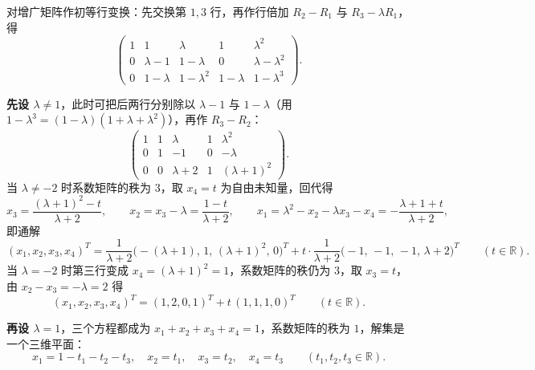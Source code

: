 \begin{solution}
对增广矩阵作初等行变换：先交换第 $1,3$ 行，再作行倍加 $R_2-R_1$ 与 $R_3-\lambda R_1$，得
\[
\left(\begin{array}{cccc|c}
1&1&\lambda&1&\lambda^{2}\\
0&\lambda-1&1-\lambda&0&\lambda-\lambda^{2}\\
0&1-\lambda&1-\lambda^{2}&1-\lambda&1-\lambda^{3}
\end{array}\right).
\]

\textbf{先设 $\lambda\ne1$}，此时可把后两行分别除以 $\lambda-1$ 与 $1-\lambda$（用 $1-\lambda^{3}=(1-\lambda)(1+\lambda+\lambda^{2})$），再作 $R_3-R_2$：
\[
\left(\begin{array}{cccc|c}
1&1&\lambda&1&\lambda^{2}\\
0&1&-1&0&-\lambda\\
0&0&\lambda+2&1&(\lambda+1)^{2}
\end{array}\right).
\]
当 $\lambda\ne-2$ 时系数矩阵的秩为 $3$，取 $x_4=t$ 为自由未知量，回代得
\[
x_3=\frac{(\lambda+1)^{2}-t}{\lambda+2},\qquad
x_2=x_3-\lambda=\frac{1-t}{\lambda+2},\qquad
x_1=\lambda^{2}-x_2-\lambda x_3-x_4=-\frac{\lambda+1+t}{\lambda+2},
\]
即通解
\[
(x_1,x_2,x_3,x_4)^{T}
=\frac{1}{\lambda+2}\bigl(-(\lambda+1),\,1,\,(\lambda+1)^{2},\,0\bigr)^{T}
+t\cdot\frac{1}{\lambda+2}\bigl(-1,\,-1,\,-1,\,\lambda+2\bigr)^{T}\qquad(t\in\mathbb{R}).
\]
当 $\lambda=-2$ 时第三行变成 $x_4=(\lambda+1)^{2}=1$，系数矩阵的秩仍为 $3$，取 $x_3=t$，由 $x_2-x_3=-\lambda=2$ 得
\[
(x_1,x_2,x_3,x_4)^{T}=(1,2,0,1)^{T}+t\,(1,1,1,0)^{T}\qquad(t\in\mathbb{R}).
\]

\textbf{再设 $\lambda=1$}，三个方程都成为 $x_1+x_2+x_3+x_4=1$，系数矩阵的秩为 $1$，解集是一个三维平面：
\[
x_1=1-t_1-t_2-t_3,\quad x_2=t_1,\quad x_3=t_2,\quad x_4=t_3\qquad(t_1,t_2,t_3\in\mathbb{R}).
\]
\end{solution}

